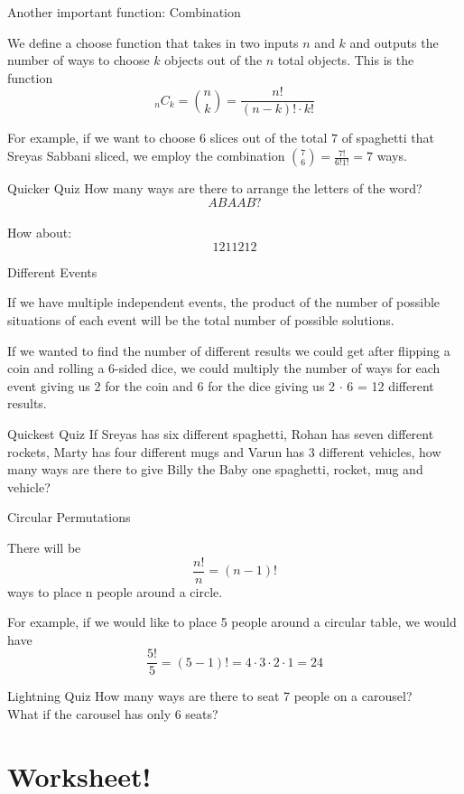 \documentclass[aspectratio=169,xcolor=dvipsnames]{beamer}
\begin{document}
\begin{frame}[t]{Another important function: Combination}
    \begin{definition}
        We define a choose function that takes in two inputs $n$ and $k$ and outputs the number of ways to choose $k$ objects out of the $n$ total objects. This is the function
        \[
        _nC_k=\binom nk=\frac{n!}{(n-k)!\cdot k!}
        \]
    \end{definition}
    
    \vspace{2cm}
    
    For example, if we want to choose $6$ slices out of the total $7$ of spaghetti that Sreyas Sabbani sliced, we employ the combination $\binom 76=\frac{7!}{6!1!}=7$ ways.
\end{frame}

\begin{frame}[t]{Quicker Quiz}
    How many ways are there to arrange the letters of the word?
    \[ABAAB?\]\\
    \vspace{1.5cm}
    How about:
    \[1211212\]
\end{frame}
\begin{frame}[t]{Different Events}
    \begin{definition}
        If we have multiple independent events, the product of the number of possible situations of each event will be the total number of possible solutions.
    \end{definition}
    \vspace{3cm}
    If we wanted to find the number of different results we could get after flipping a coin and rolling a 6-sided dice, we could multiply the number of ways for each event giving us 2 for the coin and 6 for the dice giving us 2 $\cdot$ 6 = 12 different results.
\end{frame}
\begin{frame}[t]{Quickest Quiz}
    If Sreyas has six different spaghetti, Rohan has seven different rockets, Marty has four different mugs and Varun has 3 different vehicles, how many ways are there to give Billy the Baby one spaghetti, rocket, mug and vehicle?
\end{frame}
\begin{frame}[t]{Circular Permutations}
    \begin{definition}
        There will be \[
        \frac{n!}{n} = (n-1)!
        \]
        ways to place n people around a circle.
        
    \end{definition}
    \vspace{2.5cm}
    For example, if we would like to place 5 people around a circular table, we would have \[\frac{5!}{5} = (5-1)! = 4 \cdot 3 \cdot 2 \cdot 1 = 24\]

\end{frame}
\begin{frame}[t]{Lightning Quiz}
    How many ways are there to seat 7 people on a carousel? \\
    \vspace{2.5cm}
    What if the carousel has only 6 seats?
\end{frame}
\section{Worksheet!}
\end{document}
